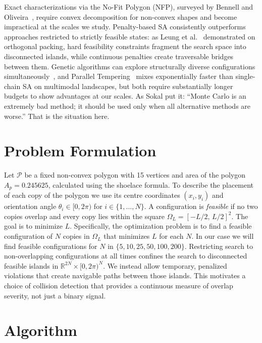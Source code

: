 \documentclass[10pt,twocolumn]{article}
\begin{document}
Exact characterizations via the No-Fit Polygon (NFP),
surveyed by Bennell and Oliveira~\cite{bennell2008}, require convex
decomposition for non-convex shapes and become impractical at the
scales we study. Penalty-based SA consistently outperforms approaches
restricted to strictly feasible states: as Leung et al.~\cite{leung2003}
demonstrated on orthogonal packing, hard feasibility constraints
fragment the search space into disconnected islands, while continuous
penalties create traversable bridges between them. Genetic algorithms
can explore structurally diverse configurations
simultaneously~\cite{burke2006}, and Parallel
Tempering~\cite{hukushima1996} mixes exponentially faster than
single-chain SA on multimodal landscapes, but both require
substantially longer budgets to show advantages at our scales. As
Sokal put it: ``Monte Carlo is an extremely bad method; it should be
used only when all alternative methods are worse.'' That is the
situation here.

\section{Problem Formulation}
\label{sec:formulation}

Let $\mathcal{P}$ be a fixed non-convex polygon with 15 vertices and area of the polygon
$A_p = 0.245625$, calculated using the shoelace formula. To describe the placement of each
copy of the polygon we use its centre coordinates $(x_i,y_i)$ and orientation angle $\theta_i \in
[0,2\pi)$  for $i\in \{1,\dots,N\}$. A
configuration is \emph{feasible} if no two copies overlap and every
copy lies within the square $\Omega_L = [-L/2,\,L/2]^2$. The goal is
to minimize $L$. Specifically, the optimization problem is to find a feasible configuration 
of $N$ copies in $\Omega_L$ that minimizes $L$ for each $N$. In our case we will find
feasible configurations for  $N$ in $\{5, 10, 25, 50, 100, 200\}$.
Restricting search to non-overlapping configurations at all
times confines the search to disconnected feasible islands in
$\mathbb{R}^{2N} \times [0,2\pi)^N$. We instead allow temporary,
penalized violations that create navigable paths between those islands. This 
motivates a choice of collision detection that provides a continuous measure of overlap severity,
 not just a binary signal.

\section{Algorithm}
\label{sec:algorithm}
\end{document}
